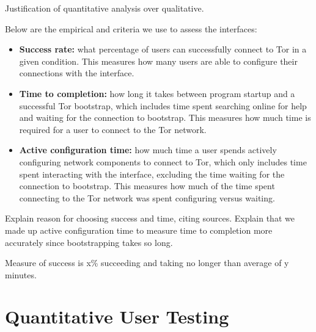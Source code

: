 \documentclass[USenglish,oneside,twocolumn]{article}
\begin{document}
{\color {blue}
Justification of quantitative analysis over qualitative. 

Below are the empirical and criteria we use to assess the interfaces:  
\begin{itemize}
\item {\bfseries Success rate:} what percentage of users can successfully connect to Tor in a given condition. This measures how many users are able to configure their connections with the interface. 
\item {\bfseries  Time to completion:} how long it takes between program startup and a successful Tor bootstrap, which includes time spent searching online for help and waiting for the connection to bootstrap. This measures how much time is required for a user to connect to the Tor network. 
\item {\bfseries Active configuration time:} how much time a user spends actively configuring network components to connect to Tor, which only includes time spent interacting with the interface, excluding the time waiting for the connection to bootstrap. This measures how much of the time spent connecting to the Tor network was spent configuring versus waiting. 
\end{itemize}

Explain reason for choosing success and time, citing sources. Explain that we made up active configuration time to measure time to completion more accurately since bootstrapping takes so long. 

Measure of success is x\% succeeding and taking no longer than average of y minutes. 
}

\section{Quantitative User Testing}
\label{sec:quantitative}
\end{document}
